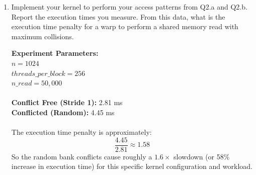 \documentclass{article}
\newenvironment{answer}
{\par\color{blue}}
{\normalfont\par}
\begin{document}
\begin{enumerate}
\begin{enumerate}
                    \begin{answer}
                        To maximize shared memory collisions, we use random strides. We initialize the stride array with random values using .
                        This assigns a random stride $S_i$ to each thread.
                        Unlike the constant stride case where the relative spacing ($Addr_a - Addr_b$) is preserved, random strides cause the threads to jump to arbitrary offsets relative to each other.
                        At any given step, the 32 threads in a warp access 32 effectively random addresses. By the birthday paradox, mapping 32 items randomly into 32 bins (banks) results in a high probability of collisions
                        (See the results of Question 3 for an empirical simulation of this collision rate, approx. 3.53x).
                        When multiple threads access the same bank (but different addresses), the hardware must serialize the requests, serving them one by one. This serialization penalty is what makes the code slow.
                        While we cannot easily enforce a strict 32-way serialization at every step due to the kernel structure, random strides statistically generate a heavy collision load compared to any conflict-free pattern.
                        .
                    \end{answer}
                    \clearpage
              \item Implement your kernel to perform your access patterns from Q2.a and Q2.b. Report the execution times you measure. From this data, what is the execution time penalty for a warp to perform a shared memory read with maximum collisions.

                    \begin{answer}
                        \textbf{Experiment Parameters:} \\
                        $n = 1024$ \\
                        $threads\_per\_block = 256$ \\
                        $n\_read = 50,000$ \\
                        \\
                        \textbf{Conflict Free (Stride 1):} 2.81 ms \\
                        \textbf{Conflicted (Random):} 4.45 ms
                        \\ \\
                        The execution time penalty is approximately:
                        $$ \frac{4.45}{2.81} \approx 1.58 $$
                        So the random bank conflicts cause roughly a $1.6\times$ slowdown (or 58\% increase in execution time) for this specific kernel configuration and workload.
                    \end{answer}


\end{enumerate}
\end{enumerate}
\end{document}
